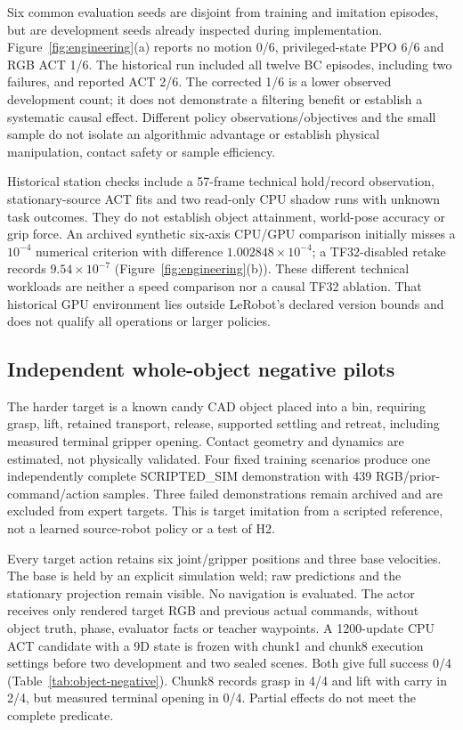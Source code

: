 \documentclass[conference]{IEEEtran}
\begin{document}
Six common evaluation seeds are disjoint from training and imitation episodes, but are development seeds already inspected during implementation. Figure~\ref{fig:engineering}(a) reports no motion 0/6, privileged-state PPO 6/6 and RGB ACT 1/6. The historical run included all twelve BC episodes, including two failures, and reported ACT 2/6. The corrected 1/6 is a lower observed development count; it does not demonstrate a filtering benefit or establish a systematic causal effect. Different policy observations/objectives and the small sample do not isolate an algorithmic advantage or establish physical manipulation, contact safety or sample efficiency.

Historical station checks include a 57-frame technical hold/record observation, stationary-source ACT fits and two read-only CPU shadow runs with unknown task outcomes. They do not establish object attainment, world-pose accuracy or grip force. An archived synthetic six-axis CPU/GPU comparison initially misses a $10^{-4}$ numerical criterion with difference $1.002848\!\times\!10^{-4}$; a TF32-disabled retake records $9.54\!\times\!10^{-7}$ (Figure~\ref{fig:engineering}(b)). These different technical workloads are neither a speed comparison nor a causal TF32 ablation. That historical GPU environment lies outside LeRobot's declared version bounds and does not qualify all operations or larger policies.

\subsection{Independent whole-object negative pilots}
The harder target is a known candy CAD object placed into a bin, requiring grasp, lift, retained transport, release, supported settling and retreat, including measured terminal gripper opening. Contact geometry and dynamics are estimated, not physically validated. Four fixed training scenarios produce one independently complete SCRIPTED\_SIM demonstration with 439 RGB/prior-command/action samples. Three failed demonstrations remain archived and are excluded from expert targets. This is target imitation from a scripted reference, not a learned source-robot policy or a test of H2.

Every target action retains six joint/gripper positions and three base velocities. The base is held by an explicit simulation weld; raw predictions and the stationary projection remain visible. No navigation is evaluated. The actor receives only rendered target RGB and previous actual commands, without object truth, phase, evaluator facts or teacher waypoints. A 1200-update CPU ACT candidate with a 9D state is frozen with chunk1 and chunk8 execution settings before two development and two sealed scenes. Both give full success 0/4 (Table~\ref{tab:object-negative}). Chunk8 records grasp in 4/4 and lift with carry in 2/4, but measured terminal opening in 0/4. Partial effects do not meet the complete predicate.
\end{document}
